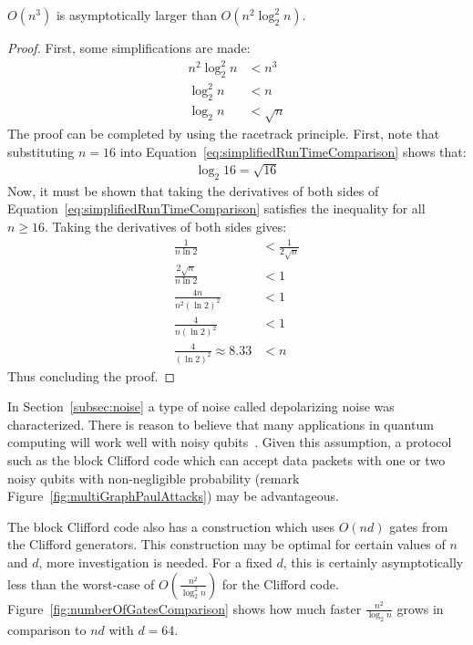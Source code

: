 \begin{myLemmarep}
$O\left(n^3\right)$ is asymptotically larger than $O\left(n^2 \log_2^2 n\right)$.
\end{myLemmarep}
\begin{proof}
First, some simplifications are made:
\begin{align}
n^2 \log_2^2 n &< n^3\\
\log_2^2 n &< n \\
\log_2 n &< \sqrt{n} \label{eq:simplifiedRunTimeComparison}
\end{align}
 The proof can be completed by using the racetrack principle. First, note that substituting $n = 16$ into Equation~\eqref{eq:simplifiedRunTimeComparison} shows that:
\begin{align}
\log_2 16 = \sqrt{16}
\end{align}
Now, it must be shown that taking the derivatives of both sides of Equation~\eqref{eq:simplifiedRunTimeComparison} satisfies the inequality for all $n \geq 16$. Taking the derivatives of both sides gives:
\begin{align}
\frac{1}{n \ln 2} &< \frac{1}{2\sqrt{n}}\\
\frac{2\sqrt{n}}{n \ln 2} &< 1\\
\frac{4n}{n^2 (\ln 2)^2} &< 1\\
\frac{4}{n (\ln 2)^2} &< 1\\
\frac{4}{(\ln 2)^2} \approx 8.33 &< n
\end{align}
Thus concluding the proof.
\end{proof}

In Section~\ref{subsec:noise} a type of noise called depolarizing noise was characterized. There is reason to believe that many applications in quantum computing will work well with noisy qubits~\cite{noisyQuantuamMachineLearning,sheldon2019quantum,rosch2022quantum,approximateQuantumComputing,noiseToTheirAdvantage}. Given this assumption, a protocol such as the block Clifford code which can accept data packets with one or two noisy qubits with non-negligible probability (remark Figure~\ref{fig:multiGraphPaulAttacks}) may be advantageous.

The block Clifford code also has a construction which uses $O\left(nd\right)$ gates from the Clifford generators. This construction may be optimal for certain values of $n$ and $d$, more investigation is needed. For a fixed $d$, this is certainly asymptotically less than the worst-case of $O\left(\frac{n^2}{\log_2^2 n}\right)$ for the Clifford code. Figure~\ref{fig:numberOfGatesComparison} shows how much faster $\frac{n^2}{\log_2 n}$ grows in comparison to $nd$ with $d= 64$.


